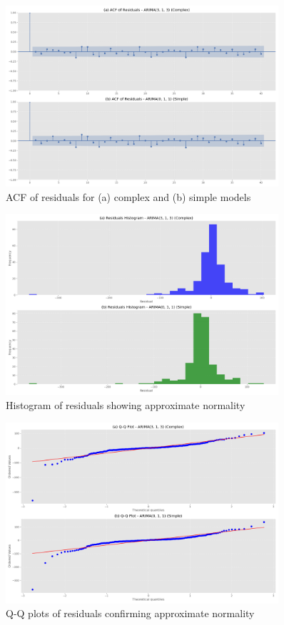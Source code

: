 \documentclass[11pt,a4paper]{article}
\begin{document}
\begin{figure}[H]
    \centering
    \includegraphics[width=0.9\textwidth]{plots/arima/gdp/figure4_acf_residuals_comparison.png}
    \caption{ACF of residuals for (a) complex and (b) simple models}
    \label{fig:residual_acf}
\end{figure}

\begin{figure}[H]
    \centering
    \includegraphics[width=0.9\textwidth]{plots/arima/gdp/figure5_histogram_residuals_comparison.png}
    \caption{Histogram of residuals showing approximate normality}
    \label{fig:residual_histogram}
\end{figure}

\begin{figure}[H]
    \centering
    \includegraphics[width=0.9\textwidth]{plots/arima/gdp/figure6_qq_residuals_comparison.png}
    \caption{Q-Q plots of residuals confirming approximate normality}
    \label{fig:residual_qq}
\end{figure}
\end{document}
